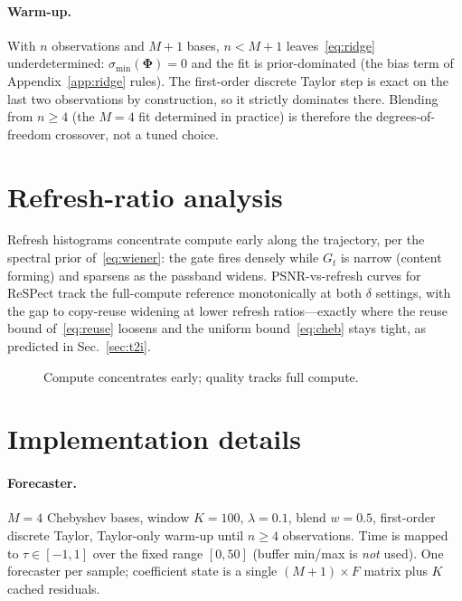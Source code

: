 \documentclass[10pt,twocolumn,letterpaper]{article}
\begin{document}
\paragraph{Warm-up.} With $n$ observations and $M{+}1$ bases, $n < M{+}1$
leaves~\eqref{eq:ridge} underdetermined: $\sigma_{\min}(\mathbf{\Phi}) =
0$ and the fit is prior-dominated (the bias term of
Appendix~\ref{app:ridge} rules). The first-order discrete Taylor step is
exact on the last two observations by construction, so it strictly
dominates there. Blending from $n \ge 4$ (the $M = 4$ fit determined in
practice) is therefore the degrees-of-freedom crossover, not a tuned
choice.

\section{Refresh-ratio analysis}
\label{app:refresh}
Refresh histograms concentrate compute early along the trajectory, per the
spectral prior of~\eqref{eq:wiener}: the gate fires densely while $G_t$
is narrow (content forming) and sparsens as the passband widens.
PSNR-vs-refresh curves for ReSPect track the full-compute reference
monotonically at both $\delta$ settings, with the gap to copy-reuse
widening at lower refresh ratios---exactly where the reuse bound
of~\eqref{eq:reuse} loosens and the uniform bound~\eqref{eq:cheb} stays
tight, as predicted in Sec.~\ref{sec:t2i}.

\begin{figure}[h]
  \centering
  \caption{Compute concentrates early; quality tracks full compute.}
  \label{fig:app-refresh}
\end{figure}

\section{Implementation details}
\label{app:impl}

\paragraph{Forecaster.} $M{=}4$ Chebyshev bases, window $K{=}100$,
$\lambda{=}0.1$, blend $w{=}0.5$, first-order discrete Taylor,
Taylor-only warm-up until $n \ge 4$ observations. Time is mapped to
$\tau \in [-1,1]$ over the fixed range $[0, 50]$ (buffer min/max is
\emph{not} used). One forecaster per sample; coefficient state is a single
$(M{+}1)\times F$ matrix plus $K$ cached residuals.
\end{document}
